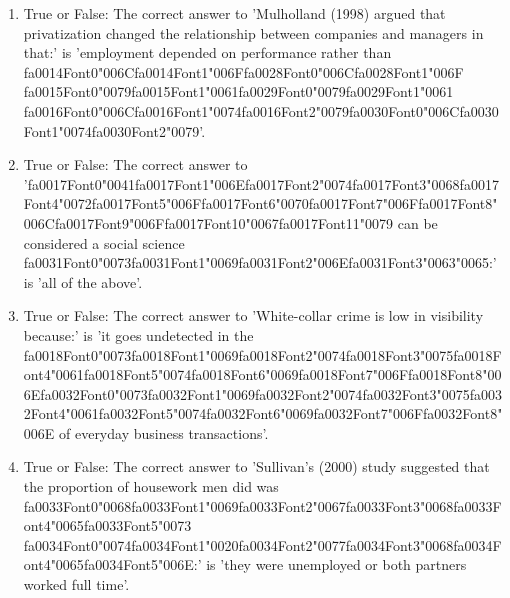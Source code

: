 \documentclass[12pt]{article}
\begin{document}
\begin{enumerate}[label=\arabic*.]
\item True or False: The correct answer to 'Mulholland (1998) argued that privatization changed the relationship between companies and managers in that:' is 'employment depended on performance rather than {\csname fa0014Font0\endcsname\char"006C}{\csname fa0014Font1\endcsname\char"006F}{\csname fa0028Font0\endcsname\char"006C}{\csname fa0028Font1\endcsname\char"006F} {\csname fa0015Font0\endcsname\char"0079}{\csname fa0015Font1\endcsname\char"0061}{\csname fa0029Font0\endcsname\char"0079}{\csname fa0029Font1\endcsname\char"0061} {\csname fa0016Font0\endcsname\char"006C}{\csname fa0016Font1\endcsname\char"0074}{\csname fa0016Font2\endcsname\char"0079}{\csname fa0030Font0\endcsname\char"006C}{\csname fa0030Font1\endcsname\char"0074}{\csname fa0030Font2\endcsname\char"0079}'.
\item True or False: The correct answer to '{\csname fa0017Font0\endcsname\char"0041}{\csname fa0017Font1\endcsname\char"006E}{\csname fa0017Font2\endcsname\char"0074}{\csname fa0017Font3\endcsname\char"0068}{\csname fa0017Font4\endcsname\char"0072}{\csname fa0017Font5\endcsname\char"006F}{\csname fa0017Font6\endcsname\char"0070}{\csname fa0017Font7\endcsname\char"006F}{\csname fa0017Font8\endcsname\char"006C}{\csname fa0017Font9\endcsname\char"006F}{\csname fa0017Font10\endcsname\char"0067}{\csname fa0017Font11\endcsname\char"0079} can be considered a social science {\csname fa0031Font0\endcsname\char"0073}{\csname fa0031Font1\endcsname\char"0069}{\csname fa0031Font2\endcsname\char"006E}{\csname fa0031Font3\endcsname\char"0063}{\char"0065}:' is 'all of the above'.
\item True or False: The correct answer to 'White-collar crime is low in visibility because:' is 'it goes undetected in the {\csname fa0018Font0\endcsname\char"0073}{\csname fa0018Font1\endcsname\char"0069}{\csname fa0018Font2\endcsname\char"0074}{\csname fa0018Font3\endcsname\char"0075}{\csname fa0018Font4\endcsname\char"0061}{\csname fa0018Font5\endcsname\char"0074}{\csname fa0018Font6\endcsname\char"0069}{\csname fa0018Font7\endcsname\char"006F}{\csname fa0018Font8\endcsname\char"006E}{\csname fa0032Font0\endcsname\char"0073}{\csname fa0032Font1\endcsname\char"0069}{\csname fa0032Font2\endcsname\char"0074}{\csname fa0032Font3\endcsname\char"0075}{\csname fa0032Font4\endcsname\char"0061}{\csname fa0032Font5\endcsname\char"0074}{\csname fa0032Font6\endcsname\char"0069}{\csname fa0032Font7\endcsname\char"006F}{\csname fa0032Font8\endcsname\char"006E} of everyday business transactions'.
\item True or False: The correct answer to 'Sullivan's (2000) study suggested that the proportion of housework men did was {\csname fa0033Font0\endcsname\char"0068}{\csname fa0033Font1\endcsname\char"0069}{\csname fa0033Font2\endcsname\char"0067}{\csname fa0033Font3\endcsname\char"0068}{\csname fa0033Font4\endcsname\char"0065}{\csname fa0033Font5\endcsname\char"0073} {\csname fa0034Font0\endcsname\char"0074}{\csname fa0034Font1\endcsname\char"0020}{\csname fa0034Font2\endcsname\char"0077}{\csname fa0034Font3\endcsname\char"0068}{\csname fa0034Font4\endcsname\char"0065}{\csname fa0034Font5\endcsname\char"006E}:' is 'they were unemployed or both partners worked full time'.

\end{enumerate}
\end{document}
